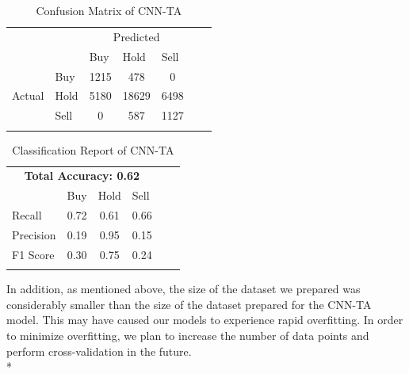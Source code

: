 \documentclass{article}
\begin{document}
\begin{table}[H]
    \centering
    \caption{Confusion Matrix of CNN-TA}
    \begin{tabular}{llcccll}
        \cline{1-5}
        \multicolumn{1}{|l|}{} & \multicolumn{1}{l|}{} & \multicolumn{3}{c|}{Predicted} & & \\\cline{1-5} \multicolumn{1}{|l|}{} & \multicolumn{1}{l|}{} & \multicolumn{1}{l|}{Buy} & \multicolumn{1}{l|}{Hold} & \multicolumn{1}{l|}{Sell} & & \\\cline{1-5} \multicolumn{1}{|c|}{\multirow{3}{*}{Actual}} & \multicolumn{1}{l|}{Buy} & \multicolumn{1}{c|}{1215} & \multicolumn{1}{c|}{478} & \multicolumn{1}{c|}{0} & & \\\cline{2-5} \multicolumn{1}{|c|}{} & \multicolumn{1}{l|}{Hold} & \multicolumn{1}{c|}{5180} & \multicolumn{1}{c|}{18629} & \multicolumn{1}{c|}{6498} & & \\\cline{2-5} \multicolumn{1}{|c|}{} & \multicolumn{1}{l|}{Sell} & \multicolumn{1}{c|}{0} & \multicolumn{1}{c|}{587} & \multicolumn{1}{c|}{1127} & & \\\cline{1-5} & & \multicolumn{1}{l}{} & \multicolumn{1}{l}{} & \multicolumn{1}{l}{} & & 
    \end{tabular}
\end{table}
\begin{table}[H]
    \centering
    \caption{Classification Report of CNN-TA}
    \begin{tabular}{lcccll}
        \cline{1-4}
        \multicolumn{4}{|c|}{\textbf{Total Accuracy: 0.62}} & & \\\cline{1-4} \multicolumn{1}{|l|}{} & \multicolumn{1}{l|}{Buy} & \multicolumn{1}{l|}{Hold} & \multicolumn{1}{l|}{Sell} & & \\ \cline{1-4} \multicolumn{1}{|l|}{Recall} & \multicolumn{1}{c|}{0.72} & \multicolumn{1}{c|}{0.61} & \multicolumn{1}{c|}{0.66} & & \\\cline{1-4} \multicolumn{1}{|l|}{Precision} & \multicolumn{1}{c|}{0.19} & \multicolumn{1}{c|}{0.95} & \multicolumn{1}{c|}{0.15} &  &  \\\cline{1-4} \multicolumn{1}{|l|}{F1 Score}  & \multicolumn{1}{c|}{0.30} & \multicolumn{1}{c|}{0.75} & \multicolumn{1}{c|}{0.24} & & \\\cline{1-4} & \multicolumn{1}{l}{} & \multicolumn{1}{l}{} & \multicolumn{1}{l}{} & &
    \end{tabular}
\end{table}
\noindent
In addition, as mentioned above, the size of the dataset we prepared was considerably smaller than the size of the dataset prepared for the CNN-TA model. This may have caused our models to experience rapid overfitting. In order to minimize overfitting, we plan to increase the number of data points and perform cross-validation in the future. \vspace{0.2cm}\\*
\end{document}
